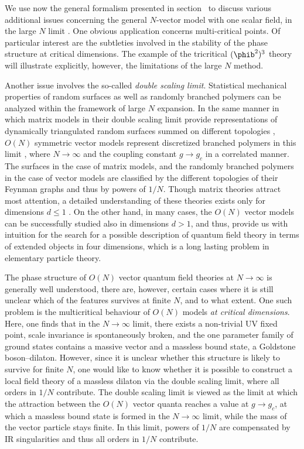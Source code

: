 We use now the general formalism presented in section \ssNbosgen\
to discuss various additional issues concerning the general
$N$-vector model with one scalar field, in the large $N$ limit
\rEMNZJ. One obvious application concerns multi-critical points.
Of particular interest are the subtleties involved in the
stability of the phase structure at critical dimensions. The
example of the tricritical $(\phib^2)^3$ theory will illustrate
explicitly, however, the limitations of the large $N$
method.\sslbl\ssdblescal\par Another issue involves the so-called
{\it double scaling limit}. Statistical mechanical properties of
random surfaces as well as randomly branched polymers can be
analyzed within the framework of large $N$ expansion. In the same
manner in which matrix models in their double scaling limit
provide representations  of dynamically triangulated random
surfaces summed on different topologies \rmatrix, $O(N)$ symmetric
vector models represent discretized branched polymers in this
limit , where $N\to\infty$ and the
coupling constant $g \to g_{c}$ in a correlated manner. The
surfaces in the case of matrix models, and the randomly branched
polymers in the case of vector models are classified by the
different topologies of their Feynman graphs and thus by powers of
$1/N$. Though matrix theories attract most  attention, a detailed
understanding of these theories exists only for dimensions  $d
\leq 1$ \rmatrixDi. On the other hand, in  many cases, the $O(N)$
vector models can be successfully studied  also  in dimensions $d
> 1$, and thus, provide us with intuition for the search for a
possible description of quantum field theory in terms of extended
objects in four dimensions, which is a long lasting problem in
elementary particle theory.

The phase structure of $O(N)$ vector quantum field theories at $ N
\to \infty $ is generally well understood, there are, however,
certain cases where it is still unclear which of the features
survives at finite $N$, and to what extent. One such problem is
the multicritical behaviour of $O(N)$ models {\it at critical
dimensions}. Here, one finds that in the $N \to \infty$ limit,
there exists a non-trivial UV fixed point, scale invariance is
spontaneously broken, and the one parameter family of ground
states contains a massive vector and a massless bound state, a
Goldstone boson--dilaton. However, since it is unclear whether
this structure is likely to survive for finite $N$, one would like
to know whether it is possible to construct a local field theory
of a massless dilaton via the double scaling limit, where all
orders in $1/N$ contribute. The double scaling limit is viewed as
the limit at which the attraction between the $O(N)$ vector quanta
reaches a value at $g \to g_c$, at which a massless bound state is
formed in the $N \to \infty$ limit, while the mass of the vector
particle stays finite. In this limit, powers of $1/N$ are
compensated by IR singularities and thus all orders in $1/N$
contribute.

